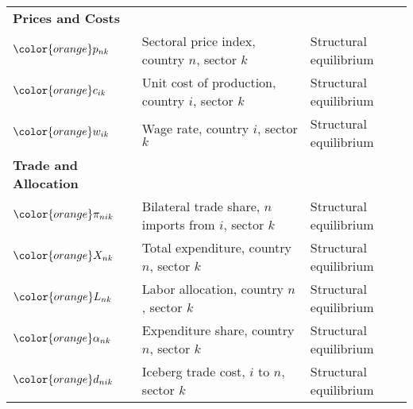 \begin{table}[H]
\begin{tabular}{>{\raggedright}p{3cm} >{\raggedright}p{6cm} >{\raggedright\arraybackslash}p{5cm}}
\multicolumn{3}{l}{\textbf{\large Endogenous Variables}} \\
\midrule
\textbf{Prices and Costs} & & \\
${\color{orange}p_{nk}}$ & Sectoral price index, country $n$, sector $k$ & Structural equilibrium \\
${\color{orange}c_{ik}}$ & Unit cost of production, country $i$, sector $k$ & Structural equilibrium \\
${\color{orange}w_{ik}}$ & Wage rate, country $i$, sector $k$ & Structural equilibrium \\
\addlinespace[0.3em]
\textbf{Trade and Allocation} & & \\
${\color{orange}\pi_{nik}}$ & Bilateral trade share, $n$ imports from $i$, sector $k$ & Structural equilibrium \\
${\color{orange}X_{nk}}$ & Total expenditure, country $n$, sector $k$ & Structural equilibrium \\
${\color{orange}L_{nk}}$ & Labor allocation, country $n$, sector $k$ & Structural equilibrium \\
${\color{orange}\alpha_{nk}}$ & Expenditure share, country $n$, sector $k$ & Structural equilibrium \\
${\color{orange}d_{nik}}$ & Iceberg trade cost, $i$ to $n$, sector $k$ & Structural equilibrium \\
\bottomrule
\end{tabular}
\end{table}
